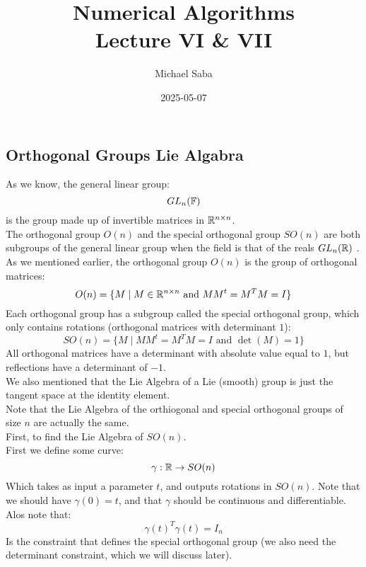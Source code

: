 \documentclass[12pt]{article}
\title{%
    \Huge Numerical Algorithms \\
    \Large Lecture VI \& VII
}
\date{2025-05-07}
\author{Michael Saba}
\begin{document}
\maketitle
\newpage
\setlength{\parindent}{0pt}

\subsection*{Orthogonal Groups
Lie Algabra}

As we know, the general linear group:
\[ GL_n(\mathbb{F}) \]
is the group made up of invertible
matrices in $\mathbb{R}^{n \times n}$. \\
The orthogonal group $O(n)$
and the special orthogonal group $SO(n)$
are both subgroups of the general linear
group when the field is that of the reals
$GL_n(\mathbb{R})$ . \\

As we mentioned earlier,
the orthogonal group $O(n)$
is the group of orthogonal matrices:
\[ O(n) = \{ M \mid M \in \mathbb{R}^{n \times n}
\text{ and } MM^t = M^TM = I \} \]
Each orthogonal group has a
subgroup called the special
orthogonal group, which only contains
rotations (orthogonal matrices with
determinant $1$):
\[ SO(n) = \{ M \mid MM^t = M^TM = I
\text{ and } \det(M) = 1 \} \]
All orthogonal matrices have
a determinant with absolute value
equal to $1$,
but reflections have a determinant
of $-1$. \\

We also mentioned that the Lie Algebra
of a Lie (smooth) group is just the tangent
space at the identity element. \\

Note that the Lie Algebra of the orthiogonal
and special orthogonal groups of size $n$
are actually the same. \\

First, to find the Lie Algebra of $SO(n)$. \\
First we define some curve:
\[ \gamma: \mathbb{R} \to SO(n) \]
Which takes as input a parameter $t$,
and outputs rotations in $SO(n)$.
Note that we should have $\gamma(0) = t$,
and that $\gamma$ should be continuous
and differentiable. Alos note that:
\[ \gamma(t)^T\gamma(t) = I_n \]
Is the constraint that defines the
special orthogonal group
(we also need the determinant constraint,
which we will discuss later). \\
\end{document}
